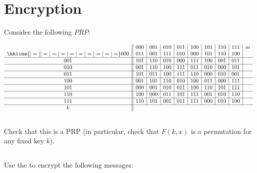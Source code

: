 \documentclass[12pt]{article}
\begin{document}
\section{Encryption}

Consider the following $PRP$:

$$
\begin{array}{c||c|c|c|c|c|c|c|c|c}
& 000 & 001 & 010 & 011 & 100 & 101 & 110 & 111 & m\\ \hhline{|=||=|=|=|=|=|=|=|=|=}
000 & 011 & 001 & 111 & 010 & 000 & 101 & 110 & 100 \\ \hline
001 & 101 & 110 & 010 & 000 & 111 & 100 & 001 & 011 \\ \hline
010 & 001 & 110 & 100 & 111 & 011 & 010 & 000 & 101 \\ \hline
011 & 101 & 011 & 100 & 111 & 110 & 000 & 010 & 001 \\ \hline
100 & 001 & 101 & 110 & 010 & 100 & 011 & 000 & 111 \\ \hline
101 & 000 & 001 & 010 & 011 & 100 & 110 & 101 & 111 \\ \hline
110 & 100 & 000 & 011 & 101 & 111 & 001 & 010 & 110 \\ \hline
111 & 110 & 101 & 001 & 011 & 111 & 000 & 010 & 100 \\ \hline
k
\end{array}
$$

\subsection{}

Check that this is a PRP (in particular, check that $F(k, x)$ is a permutation for any fixed key $k$).

\subsection{}

Use the to encrypt the following messages:
\end{document}
